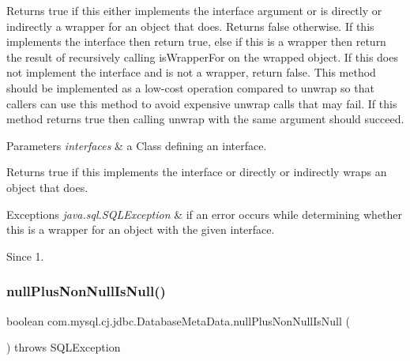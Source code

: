 Returns true if this either implements the interface argument or is directly or indirectly a wrapper for an object that does. Returns false otherwise. If this implements the interface then return true, else if this is a wrapper then return the result of recursively calling {\ttfamily is\+Wrapper\+For} on the wrapped object. If this does not implement the interface and is not a wrapper, return false. This method should be implemented as a low-\/cost operation compared to {\ttfamily unwrap} so that callers can use this method to avoid expensive {\ttfamily unwrap} calls that may fail. If this method returns true then calling {\ttfamily unwrap} with the same argument should succeed.


\begin{DoxyParams}{Parameters}
{\em interfaces} & a Class defining an interface. \\
\hline
\end{DoxyParams}
\begin{DoxyReturn}{Returns}
true if this implements the interface or directly or indirectly wraps an object that does. 
\end{DoxyReturn}

\begin{DoxyExceptions}{Exceptions}
{\em java.\+sql.\+S\+Q\+L\+Exception} & if an error occurs while determining whether this is a wrapper for an object with the given interface. \\
\hline
\end{DoxyExceptions}
\begin{DoxySince}{Since}
1. 
\end{DoxySince}
\mbox{\label{classcom_1_1mysql_1_1cj_1_1jdbc_1_1_database_meta_data_a355965ebd17887a4761a872e0d6b359d}} 
\subsubsection{\texorpdfstring{null\+Plus\+Non\+Null\+Is\+Null()}{nullPlusNonNullIsNull()}}
{\footnotesize\ttfamily boolean com.\+mysql.\+cj.\+jdbc.\+Database\+Meta\+Data.\+null\+Plus\+Non\+Null\+Is\+Null (\begin{DoxyParamCaption}{ }\end{DoxyParamCaption}) throws S\+Q\+L\+Exception}

